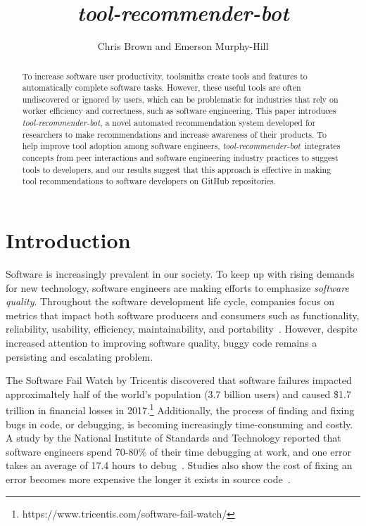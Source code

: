 \documentclass[sigconf,review,anonymous]{acmart}
\newcommand{\tool}{\textsl{tool-recommender-bot}}
\begin{document}

\title{\tool}

\author{Chris Brown and Emerson Murphy-Hill}

\begin{abstract}
To increase software user productivity, toolsmiths create tools and features to automatically complete software tasks. However, these useful tools are often undiscovered or ignored by users, which can be problematic for industries that rely on worker efficiency and correctness, such as software engineering. This paper introduces \tool, a novel automated recommendation system developed for researchers to make recommendations and increase awareness of their products. To help improve tool adoption among software engineers, \tool~integrates concepts from peer interactions and software engineering industry practices to suggest tools to developers, and our results suggest that this approach is effective in making tool recommendations to software developers on GitHub repositories.
\end{abstract}

\maketitle

\section{Introduction}

Software is increasingly prevalent in our society. To keep up with rising demands for new technology, software engineers are making efforts to emphasize \textit{software quality}. Throughout the software development life cycle, companies focus on metrics that impact both software producers and consumers such as functionality, reliability, usability, efficiency, maintainability, and portability~\cite{KitchenhamQualityTarget}. However, despite increased attention to improving software quality, buggy code remains a persisting and escalating problem. 

The Software Fail Watch by Tricentis discovered that software failures impacted approximaltely half of the world's population (3.7 billion users) and caused \$1.7 trillion in financial losses in 2017.\footnote{https://www.tricentis.com/software-fail-watch/} Additionally, the process of finding and fixing bugs in code, or debugging, is becoming increasingly time-consuming and costly.  A study by the National Institute of Standards and Technology reported that software engineers spend 70-80\% of their time debugging at work, and one error takes an average of 17.4 hours to debug~\cite{NIST}. Studies also show the cost of fixing an error becomes more expensive the longer it exists in source code~\cite{SEEconomics, SoftwareAssuranceSDLC}.
\end{document}
